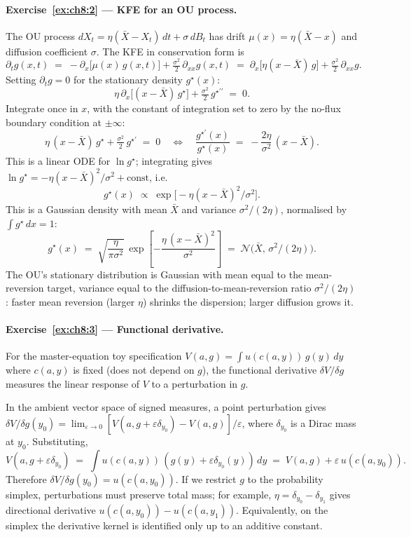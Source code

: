 \documentclass[11pt,a4paper]{report}
\begin{document}
\paragraph{Exercise~\ref{ex:ch8:2} --- KFE for an OU process.}
The OU process $dX_t = \eta(\bar X - X_t)\,dt + \sigma\,dB_t$ has drift $\mu(x) = \eta(\bar X - x)$ and diffusion coefficient $\sigma$.  The KFE in conservation form is
\[
   \partial_t g(x,t) \;=\; -\partial_x\bigl[\mu(x)\,g(x,t)\bigr] + \tfrac{\sigma^2}{2}\,\partial_{xx} g(x,t)
   \;=\; \partial_x\bigl[\eta(x - \bar X)\,g\bigr] + \tfrac{\sigma^2}{2}\,\partial_{xx} g.
\]
Setting $\partial_t g = 0$ for the stationary density $g^\star(x)$:
\[
   \eta\,\partial_x\bigl[(x - \bar X)\,g^\star\bigr] + \tfrac{\sigma^2}{2}\,g^{\star\prime\prime} \;=\; 0.
\]
Integrate once in $x$, with the constant of integration set to zero by the no-flux boundary condition at $\pm\infty$:
\[
   \eta\,(x - \bar X)\,g^\star + \tfrac{\sigma^2}{2}\,g^{\star\prime} \;=\; 0
   \quad\Longleftrightarrow\quad
   \frac{g^{\star\prime}(x)}{g^\star(x)} \;=\; -\frac{2\eta}{\sigma^2}\,(x - \bar X).
\]
This is a linear ODE for $\ln g^\star$; integrating gives $\ln g^\star = -\eta(x-\bar X)^2/\sigma^2 + \mathrm{const}$, i.e.
\[
   g^\star(x) \;\propto\; \exp\!\bigl[-\eta(x - \bar X)^2/\sigma^2\bigr].
\]
This is a Gaussian density with mean $\bar X$ and variance $\sigma^2/(2\eta)$, normalised by $\int g^\star\,dx = 1$:
\[
   g^\star(x) \;=\; \sqrt{\frac{\eta}{\pi\sigma^2}}\,\exp\!\left[-\frac{\eta\,(x - \bar X)^2}{\sigma^2}\right]
   \;=\; \mathcal{N}\!\bigl(\bar X,\, \sigma^2/(2\eta)\bigr).
\]
The OU's stationary distribution is Gaussian with mean equal to the mean-reversion target, variance equal to the diffusion-to-mean-reversion ratio $\sigma^2 / (2\eta)$: faster mean reversion (larger $\eta$) shrinks the dispersion; larger diffusion grows it.

\paragraph{Exercise~\ref{ex:ch8:3} --- Functional derivative.}
For the master-equation toy specification $V(a, g) = \int u(c(a, y))\,g(y)\,dy$ where $c(a,y)$ is fixed (does not depend on $g$), the functional derivative $\delta V / \delta g$ measures the linear response of $V$ to a perturbation in $g$.

In the ambient vector space of signed measures, a point perturbation gives $\delta V/\delta g(y_0) = \lim_{\varepsilon\to 0} [V(a, g + \varepsilon\delta_{y_0}) - V(a,g)]/\varepsilon$, where $\delta_{y_0}$ is a Dirac mass at $y_0$.  Substituting,
\[
   V(a, g + \varepsilon\delta_{y_0}) \;=\; \int u(c(a,y))\,(g(y) + \varepsilon\delta_{y_0}(y))\,dy
   \;=\; V(a,g) + \varepsilon\,u(c(a, y_0)).
\]
Therefore $\delta V/\delta g(y_0) = u(c(a, y_0))$.  If we restrict $g$ to the probability simplex, perturbations must preserve total mass; for example, $\eta=\delta_{y_0}-\delta_{y_1}$ gives directional derivative $u(c(a,y_0))-u(c(a,y_1))$.  Equivalently, on the simplex the derivative kernel is identified only up to an additive constant.
\end{document}
